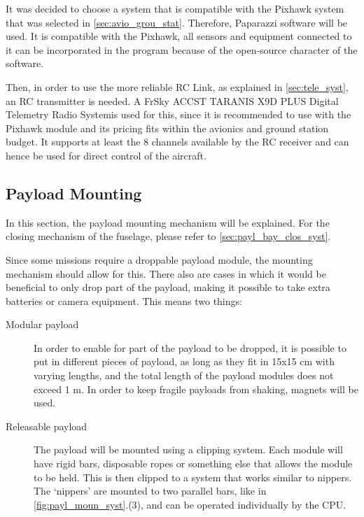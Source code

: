 It was decided to choose a system that is compatible with the Pixhawk system that was selected in \autoref{sec:avio_grou_stat}. Therefore,  Paparazzi software will be used\footnotemark. It is compatible with the Pixhawk, all sensors and equipment connected to it can be incorporated in the program because of the open-source character of the software.


Then, in order to use the more reliable RC Link, as explained in \autoref{sec:tele_syst}, an RC transmitter is needed. A FrSky ACCST TARANIS X9D PLUS Digital Telemetry Radio System\footnotemark  is used for this, since it is recommended to use with the Pixhawk module and its pricing fits within the avionics and ground station budget. It supports at least the 8 channels available by the RC receiver and can hence be used for direct control of the aircraft.




\subsection{Payload Mounting}

In this section, the payload mounting mechanism will be explained. For the closing mechanism of the fuselage, please refer to \autoref{sec:payl_bay_clos_syst}.


Since some missions require a droppable payload module, the mounting mechanism should allow for this. There also are cases in which it would be beneficial to only drop part of the payload, making it possible to take extra batteries or camera equipment. This means two things:

\begin{description}
\item[Modular payload] In order to enable for part of the payload to be dropped, it is possible to put in different pieces of payload, as long as they fit in 15x15 cm with varying lengths, and the total length of the payload modules does not exceed 1 m. In order to keep fragile payloads from shaking, magnets will be used.  
\item[Releasable payload] The payload will be mounted using a clipping system. Each module will have rigid bars, disposable ropes or something else that allows the module to be held. This is then clipped to a system that works similar to nippers. The `nippers' are mounted to two parallel bars, like in \autoref{fig:payl_moun_syst}.(3), and can be operated individually by the CPU. 
\end{description}


